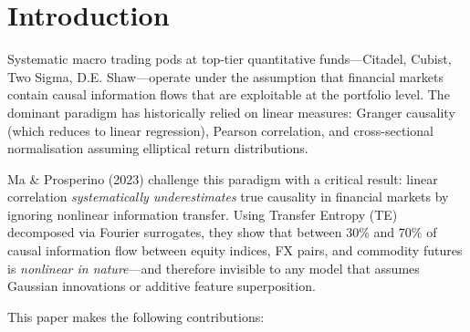 \documentclass[12pt,a4paper]{article}
\begin{document}
\tableofcontents
\newpage

\section{Introduction}

Systematic macro trading pods at top-tier quantitative funds—Citadel,
Cubist, Two Sigma, D.E. Shaw—operate under the assumption that financial
markets contain causal information flows that are exploitable at the portfolio
level. The dominant paradigm has historically relied on linear measures:
Granger causality (which reduces to linear regression), Pearson correlation,
and cross-sectional normalisation assuming elliptical return distributions.

Ma \& Prosperino (2023) challenge this paradigm with a critical result: linear
correlation \textit{systematically underestimates} true causality in financial
markets by ignoring nonlinear information transfer. Using Transfer Entropy (TE)
decomposed via Fourier surrogates, they show that between 30\% and 70\% of
causal information flow between equity indices, FX pairs, and commodity futures
is \textit{nonlinear in nature}—and therefore invisible to any model that
assumes Gaussian innovations or additive feature superposition.

This paper makes the following contributions:
\end{document}
